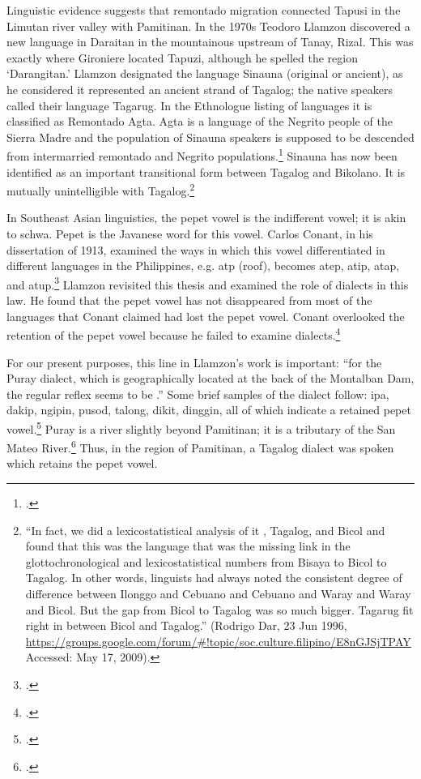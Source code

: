 Linguistic evidence suggests that remontado migration connected Tapusi in the Limutan river valley with Pamitinan. In the 1970s Teodoro Llamzon discovered a new language in Daraitan in the mountainous upstream of Tanay, Rizal. This was exactly where Gironiere located Tapuzi, although he spelled the region \enquote*{Darangitan.} Llamzon designated the language Sinauna (original or ancient), as he considered it represented an ancient strand of Tagalog; the native speakers called their language Tagarug. In the Ethnologue listing of languages it is classified as Remontado Agta. Agta is a language of the Negrito people of the Sierra Madre and the population of Sinauna speakers is supposed to be descended from intermarried remontado and Negrito populations.\footcite[s.v. \enquote{agta, remontado.}]{GordonJr.2005} Sinauna has now been identified as an important transitional form between Tagalog and Bikolano. It is mutually unintelligible with Tagalog.\footnote{\enquote{In fact, we  did a lexicostatistical analysis of it , Tagalog, and Bicol and found that this was the language that was the missing link in the glottochronological and lexicostatistical numbers from Bisaya to Bicol to Tagalog. In other words, linguists had always noted the consistent degree of difference between Ilonggo and Cebuano and Cebuano and Waray and Waray and Bicol. But the gap from Bicol to Tagalog was so much bigger. Tagarug fit right in between Bicol and Tagalog.} (Rodrigo Dar, 23 Jun 1996, \url{https://groups.google.com/forum/#!topic/soc.culture.filipino/E8nGJSjTPAY} Accessed: May 17, 2009).}

In Southeast Asian linguistics, the pepet vowel is the indifferent vowel; it is akin to schwa. Pepet is the Javanese word for this vowel. Carlos Conant, in his dissertation of 1913, examined the ways in which this vowel differentiated in different languages in the Philippines, e.g. at\textschwa p (roof), becomes atep, atip, atap, and atup.\footcite{Conant1912} Llamzon revisited this thesis and examined the role of dialects in this law. He found that the pepet vowel has not disappeared from most of the languages that Conant claimed had lost the pepet vowel. Conant overlooked the retention of the pepet vowel because he failed to examine dialects.\footcite{Llamzon1976}

For our present purposes, this line in Llamzon's work is important: \enquote{for the Puray dialect, which is geographically located at the back of the Montalban Dam, the regular reflex seems to be \textschwa.} Some brief samples of the dialect follow: ipa, dakip, ngipin, pusod, talong, dikit, dinggin, all of which indicate a retained pepet vowel.\footcite[136]{Llamzon1976} Puray is a river slightly beyond Pamitinan; it is a tributary of the San Mateo River.\footcite[28]{Ugaldezubiaur1880} Thus, in the region of Pamitinan, a Tagalog dialect was spoken which retains the pepet vowel.

